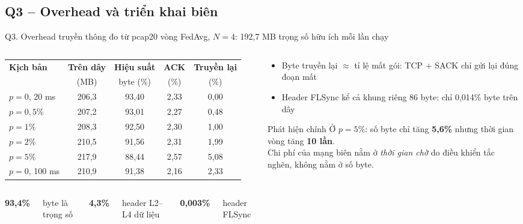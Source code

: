 \documentclass[aspectratio=169,10pt]{beamer}
\newcommand{\kpi}[2]{%
  \begin{minipage}[t]{\linewidth}\centering
    {\LARGE\bfseries\color{hustmain}#1}\par\vspace{2pt}
    {\scriptsize #2}
  \end{minipage}}
\begin{document}
\subsection{Q3 -- Overhead và triển khai biên}
\begin{frame}{Q3. Overhead truyền thông đo từ pcap}{20 vòng FedAvg, $N = 4$: 192,7 MB trọng số hữu ích mỗi lần chạy}
  \begin{columns}[c]
    \begin{column}{0.56\textwidth}
      \scriptsize
      \begin{tabular}{l c c c c}
        \toprule
        \textbf{Kịch bản} & \textbf{Trên dây} & \textbf{Hiệu suất} & \textbf{ACK} & \textbf{Truyền lại} \\
        & (MB) & byte (\%) & (\%) & (\%) \\
        \midrule
        $p = 0$, 20 ms & 206,3 & 93,40 & 2,33 & 0,00 \\
        $p = 0{,}5\%$ & 207,2 & 93,01 & 2,27 & 0,48 \\
        $p = 1\%$ & 208,3 & 92,50 & 2,30 & 1,00 \\
        $p = 2\%$ & 210,5 & 91,56 & 2,31 & 1,99 \\
        $p = 5\%$ & 217,9 & 88,44 & 2,57 & 5,08 \\
        $p = 0$, 100 ms & 210,9 & 91,38 & 2,16 & 2,33 \\
        \bottomrule
      \end{tabular}
      \vspace{6pt}

      \begin{columns}
        \kpi{93,4\%}{byte là trọng số}
        \kpi{4,3\%}{header L2--L4 dữ liệu}
        \kpi{0,003\%}{header FLSync}
      \end{columns}
    \end{column}
    \begin{column}{0.41\textwidth}
      \begin{itemize}\footnotesize
        \item Byte truyền lại $\approx$ tỉ lệ mất gói: TCP + SACK chỉ gửi lại đúng đoạn mất
        \item Header FLSync kể cả khung riêng 86 byte: chỉ 0,014\% byte trên dây
      \end{itemize}
      \begin{alertblock}{Phát hiện chính}
        Ở $p = 5\%$: số byte chỉ tăng \textbf{5,6\%} nhưng thời gian vòng tăng \textbf{10 lần}.\\
        Chi phí của mạng biên nằm ở \emph{thời gian chờ} do điều khiển tắc nghẽn, không nằm ở số byte.
      \end{alertblock}
    \end{column}
  \end{columns}
\end{frame}
\end{document}
